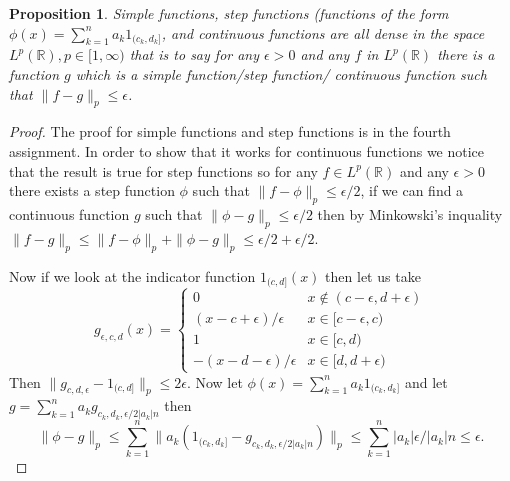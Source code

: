 \documentclass[11pt]{article}
\newtheorem{prp}[thm]{Proposition}
\theoremstyle{definition}
\theoremstyle{remark}
\begin{document}
\begin{prp}
Simple functions, step functions (functions of the form $\phi(x) = \sum_{k=1}^n a_k 1_{(c_k,d_k]}$, and continuous functions are all dense in the space $L^p(\mathbb{R}), p \in [1,\infty)$ that is to say for any $\epsilon > 0$ and any $f$ in $L^p(\mathbb{R})$ there is a function $g$ which is a simple function/step function/ continuous function such that $\|f-g\|_p \leq \epsilon$.
\end{prp}
\begin{proof}
The proof for simple functions and step functions is in the fourth assignment. In order to show that it works for continuous functions we notice that the result is true for step functions so for any $f \in L^p(\mathbb{R})$ and any $\epsilon >0$ there exists a step function $\phi$ such that $\| f-\phi\|_p \leq \epsilon/2$, if we can find a continuous function $g$ such that $\|\phi-g\|_p \leq \epsilon/2$ then by Minkowski's inquality $\|f-g\|_p \leq \|f-\phi\|_p + \|\phi - g\|_p \leq \epsilon/2 + \epsilon/2$.

Now if we look at the indicator function $1_{(c,d]}(x)$ then let us take \[g_{\epsilon, c,d}(x) = \left\{ \begin{array}{ll} 0 & x \notin (c-\epsilon, d+\epsilon) \\ (x-c+ \epsilon)/\epsilon & x \in [c-\epsilon, c) \\ 1 & x \in [c,d) \\ -(x-d -\epsilon)/\epsilon & x \in [d, d+\epsilon) \end{array} \right. \]
Then $\|g_{c,d,\epsilon}-1_{(c,d]}\|_p \leq 2\epsilon$. Now let $\phi(x) = \sum_{k=1}^n a_k 1_{(c_k,d_k]}$ and let $g = \sum_{k=1}^n a_k g_{c_k, d_k, \epsilon/2|a_k| n}$ then
\[\| \phi - g\|_p \leq \sum_{k=1}^n \| a_k (1_{(c_k, d_k]} - g_{c_k, d_k, \epsilon/2|a_k|n})\|_p \leq \sum_{k=1}^n |a_k| \epsilon/|a_k| n \leq \epsilon.  \]
\end{proof}
\end{document}
